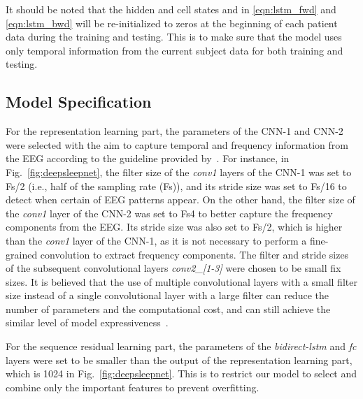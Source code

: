 \documentclass[journal,twoside]{IEEEtran}
\begin{document}
It should be noted that the hidden and cell states  and  in \eqref{eqn:lstm_fwd} and \eqref{eqn:lstm_bwd} will be re-initialized to zeros at the beginning of each patient data during the training and testing. This is to make sure that the model uses only temporal information from the current subject data for both training and testing.




\subsection{Model Specification} \label{sec:model_spec}
For the representation learning part, the parameters of the CNN-1 and CNN-2 were selected with the aim to capture temporal and frequency information from the EEG according to the guideline provided by~\cite{cohen2014}. For instance, in Fig.~\ref{fig:deepsleepnet}, the filter size of the \textit{conv1} layers of the CNN-1 was set to Fs/2 (i.e., half of the sampling rate (Fs)), and its stride size was set to Fs/16 to detect when certain of EEG patterns appear. On the other hand, the filter size of the \textit{conv1} layer of the CNN-2 was set to Fs4 to better capture the frequency components from the EEG. Its stride size was also set to Fs/2, which is higher than the \textit{conv1} layer of the CNN-1, as it is not necessary to perform a fine-grained convolution to extract frequency components. The filter and stride sizes of the subsequent convolutional layers \textit{conv2\_[1-3]} were chosen to be small fix sizes. It is believed that the use of multiple convolutional layers with a small filter size instead of a single convolutional layer with a large filter can reduce the number of parameters and the computational cost, and can still achieve the similar level of model expressiveness~\cite{szegedy2015}.

For the sequence residual learning part, the parameters of the \textit{bidirect-lstm} and \textit{fc} layers were set to
be smaller than the output of the representation learning part, which is 1024 in Fig.~\ref{fig:deepsleepnet}.
This is to restrict our model to select and combine only the important features to prevent overfitting.
\end{document}
